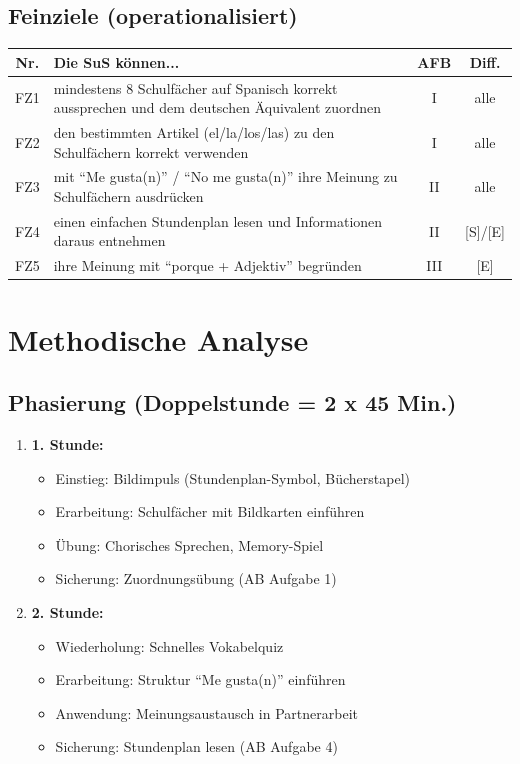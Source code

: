 \documentclass[11pt,a4paper]{article}
\begin{document}
\subsection{Feinziele (operationalisiert)}
\begin{tabular}{|c|p{8cm}|c|c|}
\hline
\textbf{Nr.} & \textbf{Die SuS können...} & \textbf{AFB} & \textbf{Diff.} \\
\hline
FZ1 & mindestens 8 Schulfächer auf Spanisch korrekt aussprechen und dem deutschen Äquivalent zuordnen & I & alle \\
\hline
FZ2 & den bestimmten Artikel (el/la/los/las) zu den Schulfächern korrekt verwenden & I & alle \\
\hline
FZ3 & mit ``Me gusta(n)'' / ``No me gusta(n)'' ihre Meinung zu Schulfächern ausdrücken & II & alle \\
\hline
FZ4 & einen einfachen Stundenplan lesen und Informationen daraus entnehmen & II & [S]/[E] \\
\hline
FZ5 & ihre Meinung mit ``porque + Adjektiv'' begründen & III & [E] \\
\hline
\end{tabular}

\section{Methodische Analyse}

\subsection{Phasierung (Doppelstunde = 2 x 45 Min.)}
\begin{enumerate}
    \item \textbf{1. Stunde:}
    \begin{itemize}
        \item Einstieg: Bildimpuls (Stundenplan-Symbol, Bücherstapel)
        \item Erarbeitung: Schulfächer mit Bildkarten einführen
        \item Übung: Chorisches Sprechen, Memory-Spiel
        \item Sicherung: Zuordnungsübung (AB Aufgabe 1)
    \end{itemize}
    \item \textbf{2. Stunde:}
    \begin{itemize}
        \item Wiederholung: Schnelles Vokabelquiz
        \item Erarbeitung: Struktur ``Me gusta(n)'' einführen
        \item Anwendung: Meinungsaustausch in Partnerarbeit
        \item Sicherung: Stundenplan lesen (AB Aufgabe 4)
    \end{itemize}
\end{enumerate}
\end{document}

